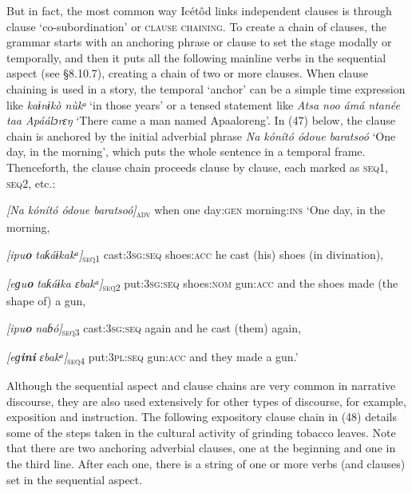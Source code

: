 \begin{table}
But in fact, the most common way Icétôd links independent clauses is through clause ‘co-subordination’ or \textsc{clause chaining}. To create a chain of clauses, the grammar starts with an anchoring phrase or clause to set the stage modally or temporally, and then it puts all the following mainline verbs in the sequential aspect (see §8.10.7), creating a chain of two or more clauses. When clause chaining is used in a story, the temporal ‘anchor’ can be a simple time expression like \textit{kaɨnɨkò nùkᵘ }‘in those years’ or a tensed statement like \textit{Atsa noo ámá ntanée taa Apáálɔrɛŋ }‘There came a man named Apaaloreng’. In (47) below, the clause chain is anchored by the initial adverbial phrase \textit{Na kónít}\textit{ó ódoue baratsoó }‘One day, in the morning’, which puts the whole sentence in a temporal frame. Thenceforth, the clause chain proceeds clause by clause, each marked as \textsc{seq1}, \textsc{seq2}, etc.:




\textit{[Na     kónító      ódoue   baratsoó]}\textsc{\textsubscript{adv}}
when    one    day:\textsc{gen}   morning:\textsc{ins  } 
‘One day, in the morning, 

\textit{[ipu}\textbf{\textit{o}}\textit{            taƙáɨkakᵃ]}\textsc{\textsubscript{seq1}}
cast:\textsc{3sg:seq}   shoes:\textsc{acc}
he cast (his) shoes (in divination),

\textit{[eɡu}\textbf{\textit{o}}\textit{           taƙáɨka         ɛbakᵃ]}\textsc{\textsubscript{seq2}}
put:\textsc{3sg:seq}   shoes\textsc{:nom}     gun:\textsc{acc}
and the shoes made (the shape of) a gun,

\textit{[ipu}\textbf{\textit{o }}\textit{           naɓó]}\textsc{\textsubscript{seq3}}
cast:\textsc{3sg:seq}   again 
and he cast (them) again,

\textit{[eɡ}\textbf{\textit{ini}}\textit{      ɛbakᵃ]}\textsc{\textsubscript{seq4}}
put:\textsc{3pl}:\textsc{seq}     gun:\textsc{acc}
and they made a gun.’


Although the sequential aspect and clause chains are very common in narrative discourse, they are also used extensively for other types of discourse, for example, exposition and instruction. The following expository clause chain in (48) details some of the steps taken in the cultural activity of grinding tobacco leaves. Note that there are two anchoring adverbial clauses, one at the beginning and one in the third line. After each one, there is a string of one or more verbs (and clauses) set in the sequential aspect. 




\end{table}

